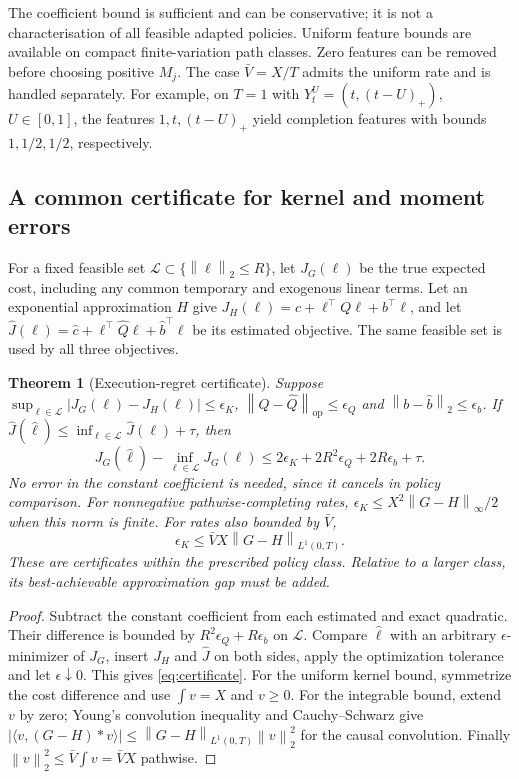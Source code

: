 \documentclass[11pt]{article}
\newcommand{\norm}[1]{\left\lVert #1\right\rVert}
\numberwithin{equation}{section}
\newtheorem{theorem}{Theorem}[section]
\theoremstyle{definition}
\theoremstyle{remark}
\newcommand{\op}{\mathrm{op}}
\theoremstyle{definition}
\begin{document}
The coefficient bound is sufficient and can be conservative; it is not a
characterisation of all feasible adapted policies. Uniform feature bounds
are available on compact finite-variation path classes. Zero features can be
removed before choosing positive $M_j$. The case $\bar V=X/T$ admits the
uniform rate and is handled separately. For example, on $T=1$ with
$Y_t^U=(t,(t-U)_+)$, $U\in[0,1]$, the features $1,t,(t-U)_+$ yield
completion features with bounds $1,1/2,1/2$, respectively.

\subsection{A common certificate for kernel and moment errors}
For a fixed feasible set $\mathcal L\subset\{\norm\ell_2\le R\}$, let
$J_G(\ell)$ be the true expected cost, including any common temporary and
exogenous linear terms. Let an exponential approximation $H$ give
$J_H(\ell)=c+\ell^\top Q\ell+b^\top\ell$, and let
$\widehat J(\ell)=\widehat c+\ell^\top\widehat Q\ell+
\widehat b^\top\ell$ be its estimated objective. The same feasible set is
used by all three objectives.

\begin{theorem}[Execution-regret certificate]\label{thm:certificate}
Suppose $\sup_{\ell\in\mathcal L}|J_G(\ell)-J_H(\ell)|\le\epsilon_K$,
$\norm{Q-\widehat Q}_{\op}\le\epsilon_Q$ and
$\norm{b-\widehat b}_2\le\epsilon_b$. If
$\widehat J(\widehat\ell)\le\inf_{\ell\in\mathcal L}
\widehat J(\ell)+\tau$, then
\begin{equation}\label{eq:certificate}
 J_G(\widehat\ell)-\inf_{\ell\in\mathcal L}J_G(\ell)
 \le 2\epsilon_K+2R^2\epsilon_Q+2R\epsilon_b+\tau.
\end{equation}
No error in the constant coefficient is needed, since it cancels in policy
comparison. For nonnegative pathwise-completing rates,
$\epsilon_K\le X^2\norm{G-H}_\infty/2$ when this norm is finite.
For rates also bounded by $\bar V$,
\begin{equation}\label{eq:l1kernelcertificate}
 \epsilon_K\le\bar V X\norm{G-H}_{L^1(0,T)}.
\end{equation}
These are certificates within the prescribed policy class. Relative to a
larger class, its best-achievable approximation gap must be added.
\end{theorem}
\begin{proof}
Subtract the constant coefficient from each estimated and exact quadratic.
Their difference is bounded by $R^2\epsilon_Q+R\epsilon_b$ on
$\mathcal L$. Compare $\widehat\ell$ with an arbitrary $\epsilon$-minimizer
of $J_G$, insert $J_H$ and $\widehat J$ on both sides, apply the optimization
tolerance and let $\epsilon\downarrow0$. This gives \eqref{eq:certificate}.
For the uniform kernel bound, symmetrize the cost difference and use
$\int v=X$ and $v\ge0$. For the integrable bound, extend $v$ by zero;
Young's convolution inequality and Cauchy--Schwarz give
$|\langle v,(G-H)*v\rangle|\le\norm{G-H}_{L^1(0,T)}\norm v_2^2$
for the causal convolution. Finally
$\norm v_2^2\le\bar V\int v=\bar V X$ pathwise.
\end{proof}
\end{document}
